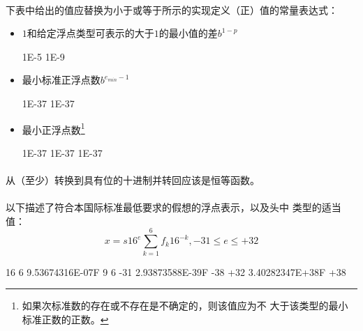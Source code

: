\paragraph{}
下表中给出的值应替换为小于或等于所示的实现定义（正）值的常量表达式：
\begin{itemize}
  \item{$1$和给定浮点类型可表示的大于$1$的最小值的差$b^{1-p}$
    \begin{itemize}
       {1E-5}
       {1E-9}
    \end{itemize}}
  \item{最小标准正浮点数$b^{e_{min}-1}$
    \begin{itemize}
       {1E-37}
       {1E-37}
    \end{itemize}}
  \item{最小正浮点数\footnote{如果次标准数的存在或不存在是不确定的，则该值应为不
    大于该类型的最小标准正数的正数。}
    \begin{itemize}
        {1E-37}
        {1E-37}
       {1E-37}
    \end{itemize}}
\end{itemize}

\recprac

\paragraph{}
从（至少）转换到具有位的十进制并转回应该是恒等函数。

\paragraph{}
\ex 以下描述了符合本国际标准最低要求的假想的浮点表示，以及头中
类型的适当值：
\begin{equation*}
  x = s16^e\sum_{k=1}^6 f_k 16^{-k}, -31 \le e \le +32
\end{equation*}
\begin{itemize}
          {16}
      {6}
        {9.53674316E-07F}
   {9}
            {6}
       {-31}
            {2.93873588E-39F}
   {-38}
       {+32}
            {3.40282347E+38F}
   {+38}
\end{itemize}

